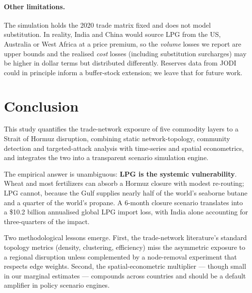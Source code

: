 \documentclass[11pt,a4paper]{article}
\begin{document}
\paragraph{Other limitations.}
The simulation holds the 2020 trade matrix fixed and does not model
substitution. In reality, India and China would source LPG from the
US, Australia or West Africa at a price premium, so the
\emph{volume} losses we report are upper bounds and the realised
\emph{cost} losses (including substitution surcharges) may be higher
in dollar terms but distributed differently. Reserves data from
JODI could in principle inform a buffer-stock extension; we leave
that for future work.

\section{Conclusion}

This study quantifies the trade-network exposure of five commodity
layers to a Strait of Hormuz disruption, combining static
network-topology, community detection and targeted-attack analysis
with time-series and spatial econometrics, and integrates the two
into a transparent scenario simulation engine.

The empirical answer is unambiguous: \textbf{LPG is the systemic
vulnerability}. Wheat and most fertilizers can absorb a Hormuz
closure with modest re-routing; LPG cannot, because the Gulf
supplies nearly half of the world's seaborne butane and a quarter
of the world's propane. A 6-month closure scenario translates into
a \$10.2 billion annualised global LPG import loss, with India alone
accounting for three-quarters of the impact.

Two methodological lessons emerge. First, the trade-network
literature's standard topology metrics (density, clustering,
efficiency) miss the asymmetric exposure to a regional disruption
unless complemented by a node-removal experiment that respects
edge weights. Second, the spatial-econometric multiplier --- though
small in our marginal estimates --- compounds across countries and
should be a default amplifier in policy scenario engines.



\end{document}
